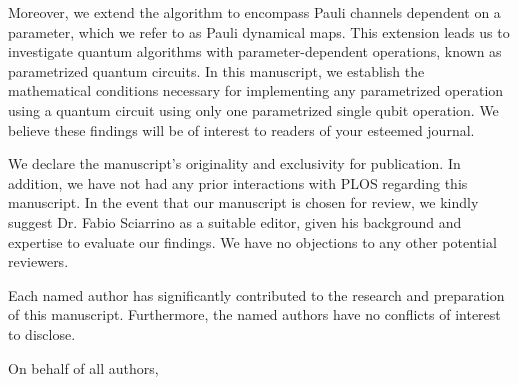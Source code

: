 \documentclass[12pt, addrfooterall, english]{if_letter_2013}
\begin{document}
\begin{letter}
Moreover, we extend the algorithm to encompass Pauli channels dependent on a
parameter, which we refer to as Pauli dynamical maps. This extension leads us
to investigate quantum algorithms with parameter-dependent operations, known as
parametrized quantum circuits.  In this manuscript, we establish the
mathematical conditions necessary for implementing any parametrized operation
using a quantum circuit using only one parametrized single qubit operation. We
believe these findings will be of interest to readers of your esteemed journal.

We declare the manuscript’s originality and exclusivity for publication. In
addition, we have not had any prior interactions with PLOS regarding this
manuscript. In the event that our manuscript is chosen for review, we kindly
suggest Dr. Fabio Sciarrino as a suitable editor, given his background and
expertise to evaluate our findings. We have no objections to any other
potential reviewers.

Each named author has significantly contributed to the research and preparation
of this manuscript. Furthermore, the named authors have no conflicts of
interest to disclose.



\closing{On behalf of all authors,}

\end{letter}
\end{document}
